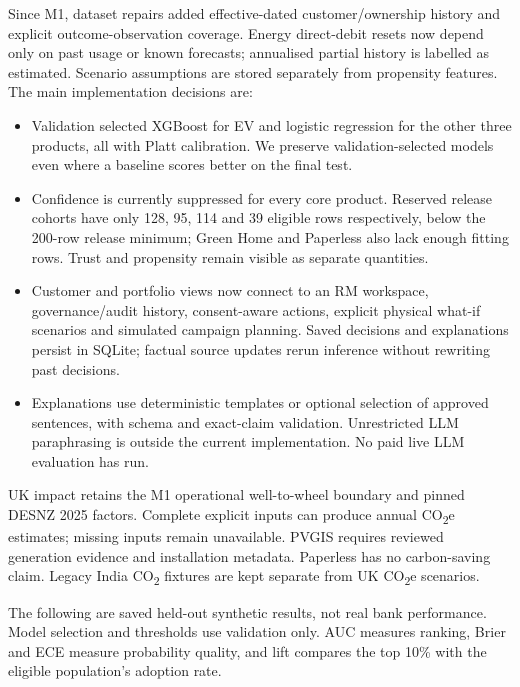 \documentclass[10pt,a4paper]{article}
\newcommand{\sect}[1]{\vspace{5pt}{\large\bfseries\color{greenr}#1}\par\vspace{1pt}}
\begin{document}
Since M1, dataset repairs added effective-dated customer/ownership history and explicit outcome-observation coverage. Energy direct-debit resets now depend only on past usage or known forecasts; annualised partial history is labelled as estimated. Scenario assumptions are stored separately from propensity features. The main implementation decisions are:
\begin{itemize}
\item Validation selected XGBoost for EV and logistic regression for the other three products, all with Platt calibration. We preserve validation-selected models even where a baseline scores better on the final test.
\item Confidence is currently suppressed for every core product. Reserved release cohorts have only 128, 95, 114 and 39 eligible rows respectively, below the 200-row release minimum; Green Home and Paperless also lack enough fitting rows. Trust and propensity remain visible as separate quantities.
\item Customer and portfolio views now connect to an RM workspace, governance/audit history, consent-aware actions, explicit physical what-if scenarios and simulated campaign planning. Saved decisions and explanations persist in SQLite; factual source updates rerun inference without rewriting past decisions.
\item Explanations use deterministic templates or optional selection of approved sentences, with schema and exact-claim validation. Unrestricted LLM paraphrasing is outside the current implementation. No paid live LLM evaluation has run.
\end{itemize}
UK impact retains the M1 operational well-to-wheel boundary and pinned DESNZ 2025 factors. Complete explicit inputs can produce annual CO\textsubscript{2}e estimates; missing inputs remain unavailable. PVGIS requires reviewed generation evidence and installation metadata. Paperless has no carbon-saving claim. Legacy India CO\textsubscript{2} fixtures are kept separate from UK CO\textsubscript{2}e scenarios.

\sect{2\quad Experiments run so far and results}
The following are saved held-out synthetic results, not real bank performance. Model selection and thresholds use validation only. AUC measures ranking, Brier and ECE measure probability quality, and lift compares the top 10\% with the eligible population's adoption rate.
\end{document}
